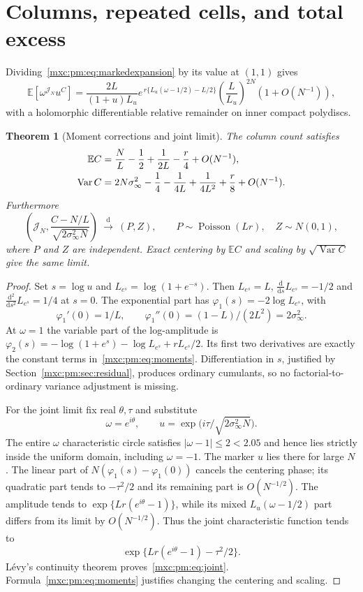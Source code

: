 \documentclass[11pt]{article}
\numberwithin{equation}{section}
\newtheorem{theorem}{Theorem}[section]
\theoremstyle{definition}
\theoremstyle{remark}
\newcommand{\E}{\mathbb E}
\DeclareMathOperator{\Pois}{Poisson}
\DeclareMathOperator{\Var}{Var}
\begin{document}
\section{Columns, repeated cells, and total excess}\label{mxc:pm:sec:probability}
Dividing~\eqref{mxc:pm:eq:markedexpansion} by its value at $(1,1)$ gives
\begin{equation}\label{mxc:pm:eq:pgf}
 \E[\omega^{\mathcal J_N}u^{C}]=
 \frac{2L}{(1+u)L_u}
 e^{\,r\{L_u(\omega-1/2)-L/2\}}
 \left(\frac L{L_u}\right)^{2N}(1+O(N^{-1})),
\end{equation}
with a holomorphic differentiable relative remainder on inner compact
polydiscs.

\begin{theorem}[Moment corrections and joint limit]\label{mxc:pm:thm:joint}
The column count satisfies
\begin{align}\label{mxc:pm:eq:moments}
 \E C&=\frac NL-\frac12+\frac1{2L}-\frac r4+O(N^{-1}),\notag\\
 \Var C&=2N\sigma_\infty^2-\frac14-\frac1{4L}
                         +\frac1{4L^2}+\frac r8+O(N^{-1}).
\end{align}
Furthermore
\begin{equation}\label{mxc:pm:eq:joint}
 \left(\mathcal J_N,\frac{C-N/L}{\sqrt{2\sigma_\infty^2N}}\right)
       \ \xrightarrow{\ \mathrm d\ }\ (P,Z),
 \qquad P\sim\Pois(Lr),\quad Z\sim N(0,1),
\end{equation}
where $P$ and $Z$ are independent. Exact centering by $\E C$ and scaling by
$\sqrt{\Var C}$ give the same limit.
\end{theorem}
\begin{proof}
Set $s=\log u$ and $L_{e^s}=\log(1+e^{-s})$. Then $L_{e^s}=L$, $\frac{\mathrm
d}{\mathrm ds}L_{e^s}=-1/2$ and $\frac{\mathrm d^2}{\mathrm ds^2}L_{e^s}=1/4$ at
$s=0$. The exponential part has $\varphi_1(s)=-2\log L_{e^s}$, with
\[
 \varphi_1'(0)=1/L,\qquad \varphi_1''(0)=(1-L)/(2L^2)=2\sigma_\infty^2.
\]
At $\omega=1$ the variable part of the log-amplitude is
$\varphi_2(s)=-\log(1+e^s)-\log L_{e^s}+rL_{e^s}/2$. Its first two derivatives
are exactly the constant terms in~\eqref{mxc:pm:eq:moments}. Differentiation
in $s$, justified by Section~\ref{mxc:pm:sec:residual}, produces ordinary
cumulants, so no factorial-to-ordinary variance adjustment is missing.

For the joint limit fix real $\theta,\tau$ and substitute
\[
 \omega=e^{i\theta},\qquad u=\exp\bigl(i\tau/\sqrt{2\sigma_\infty^2N}\bigr).
\]
The entire $\omega$ characteristic circle satisfies $|\omega-1|\le2<2.05$ and
hence lies strictly inside the uniform domain, including $\omega=-1$. The
marker $u$ lies there for large $N$. The linear part of
$N(\varphi_1(s)-\varphi_1(0))$ cancels the centering phase; its quadratic part
tends to $-\tau^2/2$ and its remaining part is $O(N^{-1/2})$. The amplitude
tends to $\exp\{Lr(e^{i\theta}-1)\}$, while its mixed $L_u(\omega-1/2)$ part
differs from its limit by $O(N^{-1/2})$. Thus the joint characteristic
function tends to
\[
 \exp\{Lr(e^{i\theta}-1)-\tau^2/2\}.
\]
L\'evy's continuity theorem proves~\eqref{mxc:pm:eq:joint}.
Formula~\eqref{mxc:pm:eq:moments} justifies changing the centering and
scaling.
\end{proof}
\end{document}
